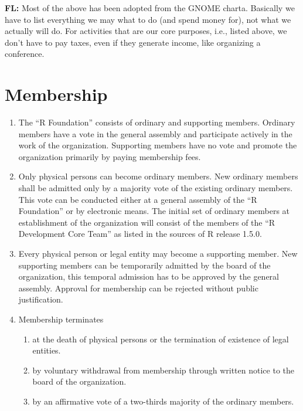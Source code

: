 \documentclass[a4paper]{article}
\newcommand{\note}[2]{{\it \par\noindent\textbf{#1:} #2}}
\begin{document}
\note{FL}{Most of the above has been adopted from the GNOME charta.
  Basically we have to list everything we may what to do (and spend
  money for), not what we actually will do. For activities that are
  our core purposes, i.e., listed above, we don't have to pay taxes,
  even if they generate income, like organizing a conference.}

\section{Membership}

\begin{enumerate}
 \item The ``R Foundation'' consists of ordinary and supporting
  members.  Ordinary members have a vote in the general assembly and
  participate actively in the work of the organization. Supporting
  members have no vote and promote the organization primarily by
  paying membership fees.
  
 \item Only physical persons can become ordinary members. New ordinary
  members shall be admitted only by a majority vote of the existing
  ordinary members. This vote can be conducted either at a general
  assembly of the ``R Foundation'' or by electronic means.  The
  initial set of ordinary members at establishment of the organization
  will consist of the members of the ``R Development Core Team'' as
  listed in the sources of R release 1.5.0.
  
 \item Every physical person or legal entity may become a supporting
  member. New supporting members can be temporarily admitted by the
  board of the organization, this temporal admission has to be
  approved by the general assembly. Approval for membership can be
  rejected without public justification.

 \item Membership terminates
  \begin{enumerate}
   \item at the death of physical persons or the termination of
    existence of legal entities.
   \item by voluntary withdrawal from membership through written
    notice to the board of the organization.
   \item by an affirmative vote of a two-thirds majority of the
    ordinary members. 
  \end{enumerate}
  
\end{enumerate}
   
\end{document}
